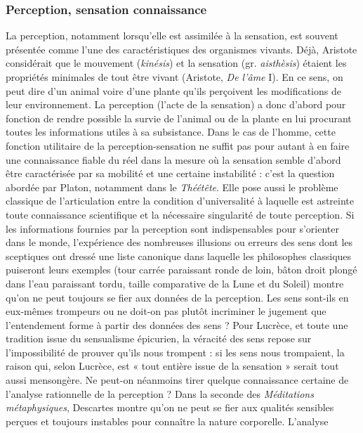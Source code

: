 \subsubsection{Perception, sensation connaissance}

La perception, notamment lorsqu'elle
est assimilée à la sensation, est souvent
présentée comme l’une des caractéristiques
des organismes vivants. Déjà, Aristote
considérait que le mouvement
({\it kinésis}) et la sensation (gr. {\it aisthèsis})
étaient les propriétés minimales de tout
être vivant (Aristote, {\it De l'âme} I). En ce
sens, on peut dire d’un animal voire d’une
plante qu’ils perçoivent les modifications
de leur environnement. La perception
(l'acte de la sensation) a donc d’abord
pour fonction de rendre possible la survie
de l’animal ou de la plante en lui procurant
toutes les informations utiles à sa
subsistance. Dans le cas de l’homme, cette
fonction utilitaire de la perception-sensation
ne suffit pas pour autant à en faire
une connaissance fiable du réel dans la
mesure où la sensation semble d’abord
être caractérisée par sa mobilité et une
certaine instabilité : c’est la question abordée
par Platon, notamment dans le {\it Théétête}.
Elle pose aussi le problème classique
de l’articulation entre la condition d’universalité
à laquelle est astreinte toute
connaissance scientifique et la nécessaire
singularité de toute perception. Si les
informations fournies par la perception
sont indispensables pour s'orienter dans
le monde, l’expérience des nombreuses
illusions ou erreurs des sens dont les sceptiques
ont dressé une liste canonique dans
laquelle les philosophes classiques puiseront
leurs exemples (tour carrée paraissant
ronde de loin, bâton droit plongé
dans l’eau paraissant tordu, taille comparative
de la Lune et du Soleil) montre
qu’on ne peut toujours se fier aux données
de la perception. Les sens sont-ils en
eux-mêmes trompeurs ou ne doit-on pas
plutôt incriminer le jugement que l’entendement
forme à partir des données des
sens ? Pour Lucrèce, et toute une tradition
issue du sensualisme épicurien, la
véracité des sens repose sur l’impossibilité
de prouver qu'ils nous trompent : si les
sens nous trompaient, la raison qui, selon
Lucrèce, est « tout entière issue de la sensation »
serait tout aussi mensongère. Ne
peut-on néanmoins tirer quelque connaissance
certaine de l’analyse rationnelle de
la perception ? Dans la seconde des {\it Méditations
métaphysiques}, Descartes montre
qu'on ne peut se fier aux qualités sensibles
perçues et toujours instables pour
connaître la nature corporelle. L'analyse
